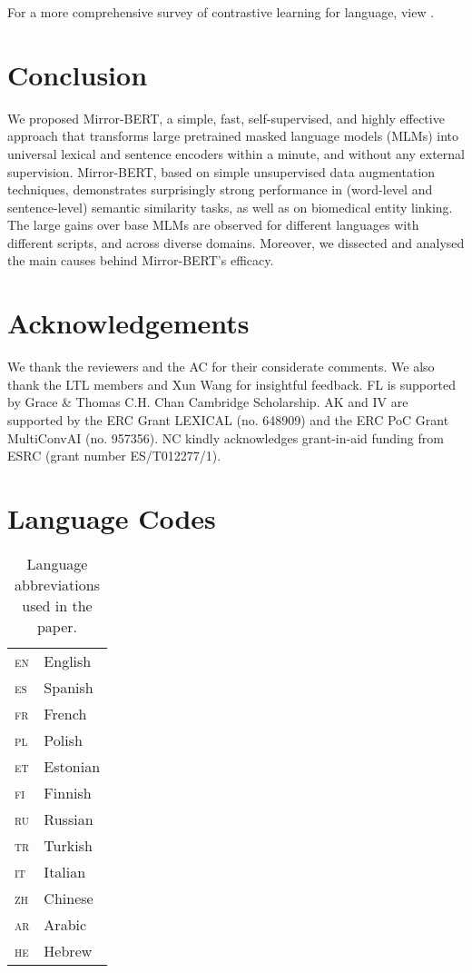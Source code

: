 \documentclass[11pt]{article}
\newcommand{\en}{{\textsc{en}}\xspace}
\newcommand{\es}{{\textsc{es}}\xspace}
\newcommand{\zh}{{\textsc{zh}}\xspace}
\newcommand{\tr}{{\textsc{tr}}\xspace}
\newcommand{\fin}{{\textsc{fi}}\xspace}
\newcommand{\ru}{{\textsc{ru}}\xspace}
\newcommand{\fr}{{\textsc{fr}}\xspace}
\newcommand{\ita}{{\textsc{it}}\xspace}
\newcommand{\et}{{\textsc{et}}\xspace}
\newcommand{\pl}{{\textsc{pl}}\xspace}
\newcommand{\ar}{{\textsc{ar}}\xspace}
\newcommand{\he}{{\textsc{he}}\xspace}
\begin{document}
For a more comprehensive survey of contrastive learning for language, view \citep{rethmeier2021primer}.

\fi



\section{Conclusion} \label{sec:conclusion}
We proposed Mirror-BERT, a simple, fast, self-supervised, and highly effective approach that transforms large pretrained masked language models (MLMs) into universal lexical and sentence encoders within a minute, and without any external supervision. Mirror-BERT, based on simple unsupervised data augmentation techniques, demonstrates surprisingly strong performance in (word-level and sentence-level) semantic similarity tasks, as well as on biomedical entity linking. The large gains over base MLMs are observed for different languages with different scripts, and across diverse domains. Moreover, we dissected and analysed the main causes behind Mirror-BERT's efficacy.



\section*{Acknowledgements}
We thank the reviewers and the AC for their considerate comments. We also thank the LTL members and Xun Wang for insightful feedback. FL is supported by Grace \& Thomas C.H. Chan Cambridge Scholarship. AK and IV are supported by the ERC Grant LEXICAL (no. 648909) and the ERC PoC Grant MultiConvAI (no. 957356). NC kindly acknowledges grant-in-aid funding from ESRC (grant number ES/T012277/1).




\clearpage
\appendix

\section{Language Codes}\label{sec:appendix_lang_code}
\begin{table}[!h]
    \centering
    \begin{tabular}{ll}
    \toprule
         \en & English  \\
         \es & Spanish \\
         \fr & French \\
         \pl & Polish \\
         \et & Estonian \\
         \fin & Finnish \\
         \ru & Russian \\
         \tr & Turkish \\
         \ita & Italian \\
         \zh & Chinese \\
         \ar & Arabic \\
         \he & Hebrew \\
    \bottomrule
    \end{tabular}
    \caption{Language abbreviations used in the paper.}
  \label{tab:lang_code}
\end{table}
\end{document}
